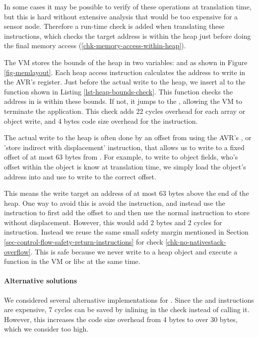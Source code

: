 In some cases it may be possible to verify of these operations at translation time, but this is hard without extensive analysis that would be too expensive for a sensor node. Therefore a run-time check is added when translating these instructions, which checks the target address is within the heap just before doing the final memory access (\ref{chk-memory-access-within-heap}).

The VM stores the bounds of the heap in two variables:  and  as shown in Figure \ref{fig-memlayout}. Each heap access instruction calculates the address to write in the AVR's  register. Just before the actual write to the heap, we insert al  to the  function shown in Listing \ref{lst-heap-bounds-check}. This function checks the address in  is within these bounds. If not, it jumps to the , allowing the VM to terminate the application. This check adds 22 cycles overhead for each array or object write, and 4 bytes code size overhead for the  instruction.

The actual write to the heap is often done by an offset from  using the AVR's , or 'store indirect with displacement' instruction, that allows us to write to a fixed offset of at most 63 bytes from . For example, to write to object fields, who's offset within the object is know at translation time, we simply load the object's address into  and use  to write to the correct offset.

This means the write target an address of at most 63 bytes above the end of the heap. One way to avoid this is avoid the  instruction, and instead use the  instruction to first add the offset to  and then use the normal  instruction to store without displacement. However, this would add 2 bytes and 2 cycles for instruction. Instead we reuse the same small safety margin mentioned in Section \ref{sec-control-flow-safety-return-instructions} for check \ref{chk-no-nativestack-overflow}. This is safe because we never write to a heap object and execute a function in the VM or libc at the same time.

\paragraph{Alternative solutions}
We considered several alternative implementations for . Since the  and  instructions are expensive, 7 cycles can be saved by inlining in the check instead of calling it. However, this increases the code size overhead from 4 bytes to over 30 bytes, which we consider too high.

